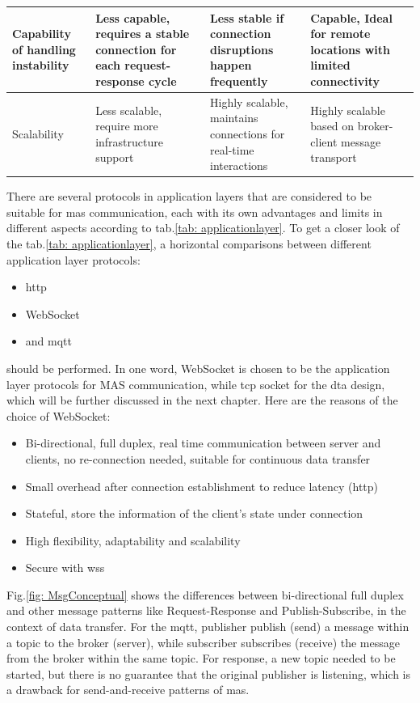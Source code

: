 \begin{table}
\begin{tabular}{|m{}|m{}|m{}|m{}|}
    Capability of handling instability & Less capable, requires a stable connection for each request-response cycle & Less stable if connection disruptions happen frequently & Capable, Ideal for remote locations with limited connectivity \\ \hline
    Scalability & Less scalable, require more infrastructure support & Highly scalable, maintains connections for real-time interactions & Highly scalable based on broker-client message transport \\ \hline
    \end{tabular}
\end{table}

There are several protocols in application layers that are considered to be suitable for \gls{mas} communication, each with its own advantages and limits in different aspects according to tab.\ref{tab: applicationlayer}.
To get a closer look of the tab.\ref{tab: applicationlayer}, a horizontal comparisons between different application layer protocols: 

\begin{itemize}
    \item \gls{http}
    \item WebSocket
    \item and \gls{mqtt}
\end{itemize}

should be performed. In one word, WebSocket is chosen to be the application layer protocols for MAS communication, while \gls{tcp} socket for the \gls{dta} design, which will be further discussed in the next chapter. Here are the reasons of the choice of WebSocket: 

\begin{itemize}
    \item Bi-directional, full duplex, real time communication between server and clients, no re-connection needed, suitable for continuous data transfer
    \item Small overhead after connection establishment to reduce latency (\gls{http})
    \item Stateful, store the information of the client's state under connection
    \item High flexibility, adaptability and scalability
    \item Secure with wss
\end{itemize}

Fig.\ref{fig: MsgConceptual} shows the differences between bi-directional full duplex and other message patterns like Request-Response and Publish-Subscribe, in the context of data transfer. 
For the \gls{mqtt}, publisher publish (send) a message within a topic to the broker (server), while subscriber subscribes (receive) the message from the broker within the same topic. 
For response, a new topic needed to be started, but there is no guarantee that the original publisher is listening, which is a drawback for send-and-receive patterns of \gls{mas}. 

